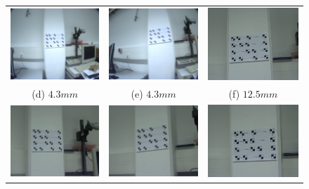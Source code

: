 \documentclass[
a4paper,     %
12pt         %
]{scrartcl}  %
\begin{document}
\begin{figure}[ht!]
\begin{tabular}{ccc}
 \includegraphics[width=48mm]{./Bildg_Messtechnik_Lab/CrossRatio/images/image_a4.png} & \includegraphics[width=48mm]{./Bildg_Messtechnik_Lab/CrossRatio/images/image_a5.png} & \includegraphics[width=48mm]{./Bildg_Messtechnik_Lab/CrossRatio/images/image_b1.png}\\
(d) $4.3mm$& (e) $4.3mm$ & (f) $12.5mm$\\[6pt]
 \includegraphics[width=48mm]{./Bildg_Messtechnik_Lab/CrossRatio/images/image_b2.png} & \includegraphics[width=48mm]{./Bildg_Messtechnik_Lab/CrossRatio/images/image_b3.png} & \includegraphics[width=48mm]{./Bildg_Messtechnik_Lab/CrossRatio/images/image_b4.png}\\

\end{tabular}
\end{figure}
\end{document}
